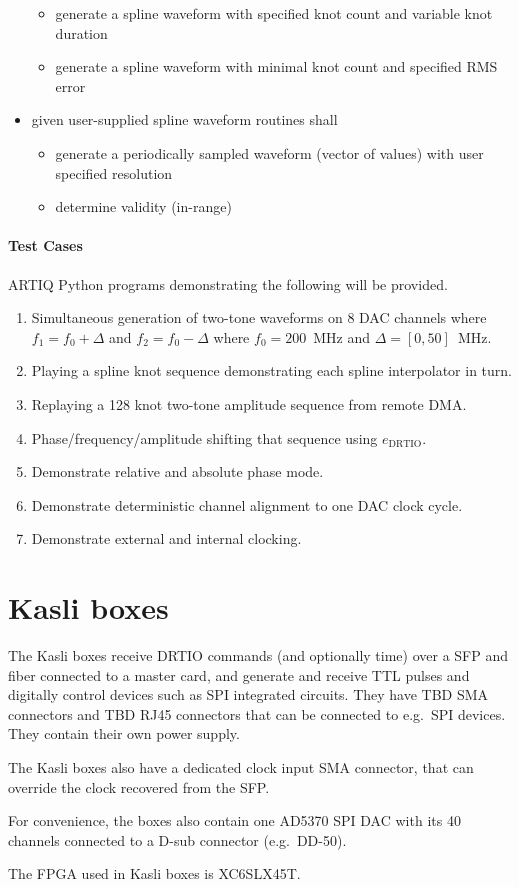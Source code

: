 \documentclass[11pt]{paper}
\begin{document}
\begin{itemize}
\begin{itemize}
		\item generate a spline waveform with specified knot count and variable knot duration 
		\item generate a spline waveform with minimal knot count and specified RMS error
	\end{itemize}
	\item given user-supplied spline waveform routines shall
	\begin{itemize}
		\item generate a periodically sampled waveform (vector of values) with user specified resolution
		\item determine validity (in-range)
	\end{itemize}

\end{itemize}

\paragraph{Test Cases}

ARTIQ Python programs demonstrating the following will be provided.

\begin{enumerate}
	\item Simultaneous generation of two-tone waveforms on 8 DAC channels where $f_{1}=f_{0}+\Delta$ and $f_{2}=f_{0}-\Delta$ where $f_{0}=200$~MHz and $\Delta=[0,50]$~MHz.
	\item Playing a spline knot sequence demonstrating each spline interpolator in
		turn.
	\item Replaying a 128 knot two-tone amplitude sequence from remote DMA.
	\item Phase/frequency/amplitude shifting that sequence using $e_\mathrm{DRTIO}$.
	\item Demonstrate relative and absolute phase mode.
	\item Demonstrate deterministic channel alignment to one DAC clock cycle.
	\item Demonstrate external and internal clocking.
\end{enumerate}

\section{Kasli boxes}
The Kasli boxes receive DRTIO commands (and optionally time) over a SFP and fiber connected to a master card, and generate and receive TTL pulses and digitally control devices such as SPI integrated circuits. They have TBD SMA connectors and TBD RJ45 connectors that can be connected to e.g.\ SPI devices. They contain their own power supply.

The Kasli boxes also have a dedicated clock input SMA connector, that can override the clock recovered from the SFP.

For convenience, the boxes also contain one AD5370 SPI DAC with its 40 channels connected to a D-sub connector (e.g.\ DD-50).

The FPGA used in Kasli boxes is XC6SLX45T.
\end{document}

